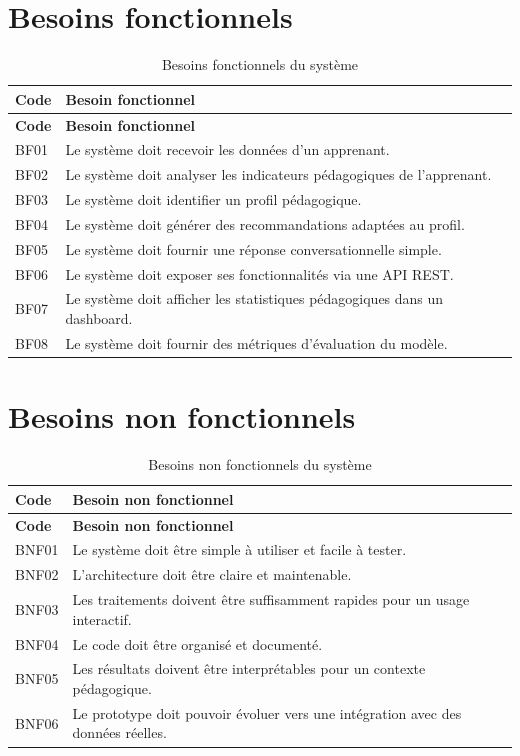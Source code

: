\documentclass[12pt,a4paper]{report}
\begin{document}
\section{Besoins fonctionnels}

\begin{longtable}{|p{2.5cm}|p{11.5cm}|}
\caption{Besoins fonctionnels du système}\\
\hline
\textbf{Code} & \textbf{Besoin fonctionnel} \\
\hline
\endfirsthead
\hline
\textbf{Code} & \textbf{Besoin fonctionnel} \\
\hline
\endhead
BF01 & Le système doit recevoir les données d'un apprenant. \\
\hline
BF02 & Le système doit analyser les indicateurs pédagogiques de l'apprenant. \\
\hline
BF03 & Le système doit identifier un profil pédagogique. \\
\hline
BF04 & Le système doit générer des recommandations adaptées au profil. \\
\hline
BF05 & Le système doit fournir une réponse conversationnelle simple. \\
\hline
BF06 & Le système doit exposer ses fonctionnalités via une API REST. \\
\hline
BF07 & Le système doit afficher les statistiques pédagogiques dans un dashboard. \\
\hline
BF08 & Le système doit fournir des métriques d'évaluation du modèle. \\
\hline
\end{longtable}

\section{Besoins non fonctionnels}

\begin{longtable}{|p{2.5cm}|p{11.5cm}|}
\caption{Besoins non fonctionnels du système}\\
\hline
\textbf{Code} & \textbf{Besoin non fonctionnel} \\
\hline
\endfirsthead
\hline
\textbf{Code} & \textbf{Besoin non fonctionnel} \\
\hline
\endhead
BNF01 & Le système doit être simple à utiliser et facile à tester. \\
\hline
BNF02 & L'architecture doit être claire et maintenable. \\
\hline
BNF03 & Les traitements doivent être suffisamment rapides pour un usage interactif. \\
\hline
BNF04 & Le code doit être organisé et documenté. \\
\hline
BNF05 & Les résultats doivent être interprétables pour un contexte pédagogique. \\
\hline
BNF06 & Le prototype doit pouvoir évoluer vers une intégration avec des données réelles. \\
\hline
\end{longtable}
\end{document}
